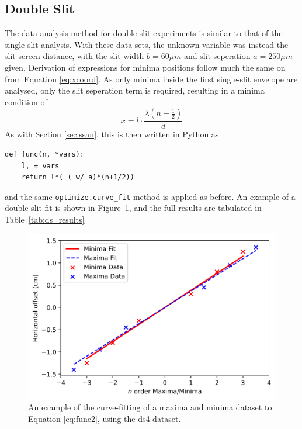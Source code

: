 \documentclass[a4paper]{article}
\begin{document}
\subsection{Double Slit} \label{sec:dsan}
The data analysis method for double-slit experiments is similar to that of the single-slit analysis. With these data sets, the unknown variable was instead the slit-screen distance, with the slit width $b=60\mu m$ and slit seperation $a=250\mu m$ given. Derivation of expressions for minima positions follow much the same on from Equation \ref{eq:xcoord}. As only minima inside the first single-slit envelope are analysed, only the slit seperation term is required, resulting in a minima condition of 
\begin{equation} \label{eq:func2}
x = l\cdot\frac{\lambda(n+\frac12)}d
\end{equation}\newpage
As with Section \ref{sec:ssan}, this is then written in Python as
\begin{lstlisting}[belowskip=-1.5 \baselineskip]
def func(n, *vars):
    l, = vars
    return l*( (_w/_a)*(n+1/2))
\end{lstlisting} and the same \lstinline$optimize.curve_fit$ method is applied as before. An example of a double-slit fit is shown in Figure~\ref{fig:ds_ex}, and the full results are tabulated in Table~\ref{tab:ds_results}

\begin{figure}[h]
  \centerline{\includegraphics[scale=0.8]{ds_ex.png}}
  \captionsetup{justification=centering}
  \caption{An example of the curve-fitting of a maxima and minima dataset to Equation \ref{eq:func2}, using the ds4 dataset.}
  \label{fig:ds_ex}
\end{figure}
\end{document}
